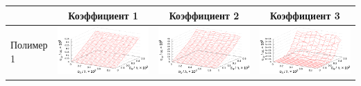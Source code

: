 \documentclass[12pt,a4paper]{article}
\begin{document}
\begin{table}[h]
  \centering
  \footnotesize
  \begin{tabular}{l | c c c}
	  & Коэффициент 1 & Коэффициент 2 & Коэффициент 3 \\ \hline
	\begin{rotate}{90}Полимер 1\end{rotate} &	\includegraphics[scale=0.4]{figs/even/p1.txt_coeff0.dat.eps} & \includegraphics[scale=0.4]{figs/even/p1.txt_coeff1.dat.eps} & \includegraphics[scale=0.4]{figs/even/p1.txt_coeff2.dat.eps} \\

\end{tabular}
\end{table}
\end{document}
